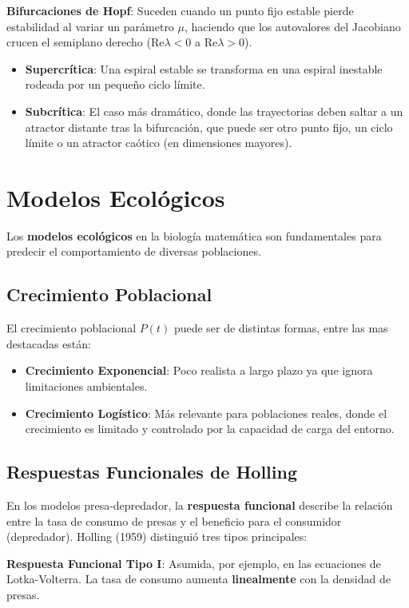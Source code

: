 \documentclass[12pt,letterpaper,oneside]{book}
\theoremstyle{definition}
\theoremstyle{remark}
\begin{document}
	\textbf{Bifurcaciones de Hopf}:
		Suceden cuando un punto fijo estable pierde estabilidad al variar un parámetro $\mu$, haciendo que los autovalores del Jacobiano crucen el semiplano derecho (Re$\lambda < 0$ a Re$\lambda > 0$).
		\begin{itemize}
			\item \textbf{Supercrítica}: Una espiral estable se transforma en una espiral inestable rodeada por un pequeño ciclo límite.
			\item \textbf{Subcrítica}: El caso más dramático, donde las trayectorias deben saltar a un atractor distante tras la bifurcación, que puede ser otro punto fijo, un ciclo límite o un atractor caótico (en dimensiones mayores).
		\end{itemize}
		
	\section{Modelos Ecológicos}
	
	Los \textbf{modelos ecológicos} en la biología matemática son fundamentales para predecir el comportamiento de diversas poblaciones.
	
	\subsection{Crecimiento Poblacional}
	
	El crecimiento poblacional $P(t)$ puede ser de distintas formas, entre las mas destacadas están:
	\begin{itemize}
		\item \textbf{Crecimiento Exponencial}: Poco realista a largo plazo ya que ignora limitaciones ambientales.
		\item \textbf{Crecimiento Logístico}: Más relevante para poblaciones reales, donde el crecimiento es limitado y controlado por la capacidad de carga del entorno.
	\end{itemize}
	
	\subsection{Respuestas Funcionales de Holling}
	
	En los modelos presa-depredador, la \textbf{respuesta funcional} describe la relación entre la tasa de consumo de presas y el beneficio para el consumidor (depredador). Holling (1959) distinguió tres tipos principales:
	
	\textbf{Respuesta Funcional Tipo I}:
		Asumida, por ejemplo, en las ecuaciones de Lotka-Volterra. La tasa de consumo aumenta \textbf{linealmente} con la densidad de presas.
	
\end{document}
